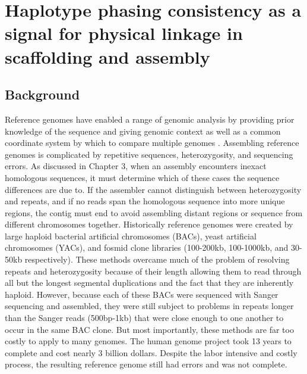 %
\chapter{Haplotype phasing consistency as a signal for physical linkage in scaffolding and assembly}

\ifpdf
    \graphicspath{{Chapter4/Figs/Raster/}{Chapter4/Figs/PDF/}{Chapter4/Figs/}}
\else
    \graphicspath{{Chapter4/Figs/Vector/}{Chapter4/Figs/}}
\fi



\section{Background}
\par{
Reference genomes have enabled a range of genomic analysis by providing prior knowledge of the sequence 
and giving genomic context as well as a common coordinate system by which to compare multiple genomes \cite{1000genomes} \cite{GRCh38}. Assembling reference genomes is complicated by repetitive sequences, heterozygosity, and sequencing errors. As discussed in Chapter 3, when an assembly encounters inexact homologous sequences, it must determine which of these cases the sequence differences are due to. 
If the assembler cannot distinguish between heterozygosity and repeats, and if no reads span the homologous sequence into more unique regions, the contig must end
to avoid assembling distant regions or sequence from different chromosomes together. Historically reference genomes were created by large haploid bacterial artificial chromosomes (BACs), yeast artificial chromosomes (YACs), and fosmid clone libraries \cite{human} (100-200kb, 100-1000kb, and 30-50kb respectively). 
These methods overcame much of the problem of resolving repeats and heterozygosity because of their length allowing them to read through all but the longest segmental duplications and the fact that they are inherently haploid. However, because each of these BACs were sequenced with Sanger sequencing and assembled, they were still subject to problems in repeats longer than the Sanger reads (500bp-1kb) that were close enough to one another to occur in the same BAC clone. But most importantly, these methods are far too costly to apply to many genomes. The human genome project took 13 years to complete and cost nearly 3 billion dollars\cite{genomeproject}. Despite the labor intensive and costly process, the resulting reference genome still had errors and was not complete\cite{grch38}.
} \\

